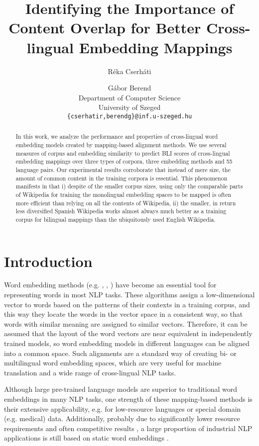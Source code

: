 \documentclass[11pt]{article}
\title{Identifying the Importance of Content Overlap for Better Cross-lingual Embedding Mappings}
\author{Réka Cserháti \and Gábor Berend \\
        Department of Computer Science \\
	    University of Szeged  \\
	{\tt \{cserhatir,berendg\}@inf.u-szeged.hu}}
\begin{document}
\maketitle
\begin{abstract}
In this work, we analyze the performance and properties of cross-lingual word embedding models created by mapping-based alignment methods.
We use several measures of corpus and embedding similarity to predict BLI scores of cross-lingual embedding mappings over three types of corpora, three embedding methods and 55 language pairs.
Our experimental results corroborate that instead of mere size, the amount of common content in the training corpora is essential. This phenomenon manifests in that i) despite of the smaller corpus sizes, using only the comparable parts of Wikipedia for training the monolingual embedding spaces to be mapped is often more efficient than relying on all the contents of Wikipedia, ii) the smaller, in return less diversified Spanish Wikipedia works almost always much better as a training corpus for bilingual mappings than the ubiquitously used English Wikipedia.
\end{abstract}

\section{Introduction}

Word embedding methods (e.g. \citealp{mikolov-distributed}, \citealp{pennington-etal-2014-glove}, \citealp{bojanowski-etal-2017-enriching}) have become an essential tool for representing words in most NLP tasks. These algorithms assign a low-dimensional vector to words based on the patterns of their contexts in a training corpus, and this way they locate the words in the vector space in a consistent way, so that words with similar meaning are assigned to similar vectors. Therefore, it can be assumed that the layout of the word vectors are near equivalent in independently trained models, so word embedding models in different languages can be aligned into a common space. Such alignments are a standard way of creating bi- or multilingual word embedding spaces, which are very useful for machine translation and a wide range of cross-lingual NLP tasks. 

Although large pre-trained language models are superior to traditional word embeddings in many NLP tasks, one strength of these mapping-based methods is their extensive applicability, e.g. for low-resource languages or special domain (e.g. medical) data. Additionally, probably due to significantly lower resource requirements \cite{strubell2019energy} and often competitive results \cite{DBLP:conf/ecir/LitschkoVPG21}, a large proportion of industrial NLP applications is still based on static word embeddings \cite{arora-etal-2020-contextual}. 
\end{document}
